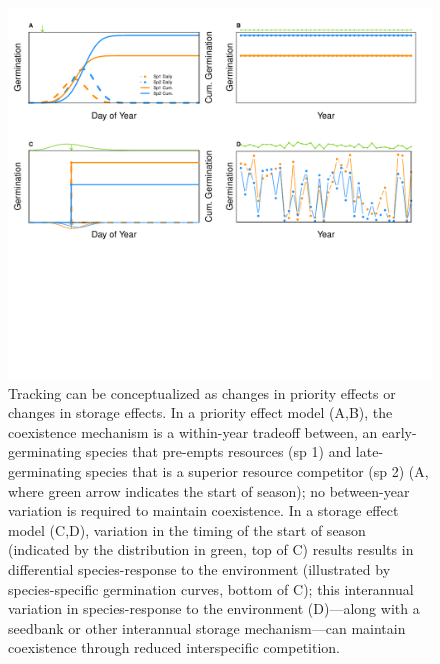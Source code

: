 \documentclass[11pt,letterpaper]{article}
\begin{document}
\begin{figure}[h!]
\centering
\includegraphics[width=1.1\textwidth]{..//..//..//R/graphs/conceptual/PriorityEff_BetHedge.pdf}
\caption{Tracking can be conceptualized as changes in priority effects or changes in storage effects.  In a priority effect model (A,B), the coexistence mechanism is a within-year tradeoff between, an early-germinating species that pre-empts resources (sp 1) and late-germinating species that is a superior resource competitor (sp 2) (A, where green arrow indicates the start of season); no between-year variation is required to maintain coexistence. In a storage effect model (C,D), variation in the timing of the start of season (indicated by the distribution in green, top of C) results results in differential species-response to the environment (illustrated by species-specific germination curves, bottom of C); this interannual variation in species-response to the environment (D)---along with a seedbank or other interannual storage mechanism---can maintain coexistence through reduced interspecific competition.}
\label{fig:conceptmodels} 
\end{figure}


\clearpage
\newpage


\end{document}
